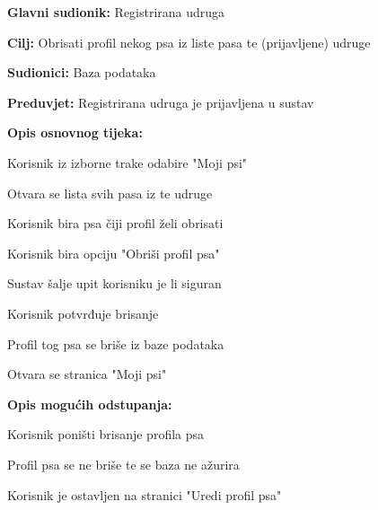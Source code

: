 		
			\noindent {}
		\begin{packed_item}
			
			\item \textbf{Glavni sudionik:} Registrirana udruga
			\item  \textbf{Cilj:} Obrisati profil nekog psa iz liste pasa te (prijavljene) udruge
			\item  \textbf{Sudionici:} Baza podataka
			\item  \textbf{Preduvjet:} Registrirana udruga je prijavljena u sustav
			\item  \textbf{Opis osnovnog tijeka:}
			
			\item[] \begin{packed_enum}
				\item Korisnik iz izborne trake odabire "Moji psi"
				\item Otvara se lista svih pasa iz te udruge
				\item Korisnik bira psa čiji profil želi obrisati
				\item Korisnik bira opciju "Obriši profil psa" 
				\item Sustav šalje upit korisniku je li siguran
				\item Korisnik potvrđuje brisanje
				\item Profil tog psa se briše iz baze podataka
				\item Otvara se stranica "Moji psi"
			\end{packed_enum}
			\item  \textbf{Opis mogućih odstupanja:}
			
			\item[] \begin{packed_item}
				
				\item [5.a]  Korisnik poništi brisanje profila psa
				\item[] \begin{packed_enum}
					\item Profil psa se ne briše te se baza ne ažurira
					\item Korisnik je ostavljen na stranici "Uredi profil psa"
				\end{packed_enum}
			\end{packed_item}
		\end{packed_item}
	
	
	
